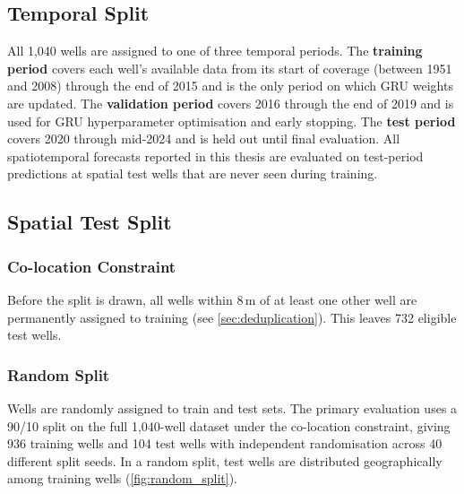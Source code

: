 \subsection{Temporal Split}
\label{sec:temporal_split}

All 1{,}040 wells are assigned to one of three temporal periods. The
\textbf{training period} covers each well's available data from its start of coverage
(between 1951 and 2008) through the end of 2015 and is the only period on which GRU weights
are updated. The \textbf{validation period} covers 2016 through the end of 2019 and is used
for GRU hyperparameter optimisation and early stopping. The \textbf{test period} covers 2020
through mid-2024 and is held out until final evaluation. All spatiotemporal forecasts reported
in this thesis are evaluated on test-period predictions at spatial test wells that are never
seen during training.

\subsection{Spatial Test Split}
\label{sec:spatial_splits}

\subsubsection{Co-location Constraint}
\label{sec:coloc_constraint}

Before the split is drawn, all wells within 8\,m of at least one other well are permanently assigned to training (see \cref{sec:deduplication}). This leaves 732 eligible test wells.

\subsubsection{Random Split}

Wells are randomly assigned to train and test sets. The primary
evaluation uses a 90/10 split on the full 1{,}040-well dataset under the co-location constraint,
giving 936 training wells and 104 test wells with independent randomisation across 40
different split seeds. In a random split, test wells are distributed geographically among training wells (\cref{fig:random_split}).

